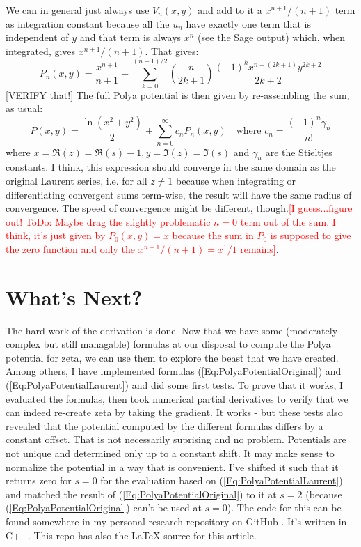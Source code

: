 \documentclass[12pt]{article}
\begin{document}
\medskip
We can in general just always use $V_n(x,y)$ and add to it a $x^{n+1}/(n+1)$ term as integration constant because all the $u_n$ have exactly one term that is independent of $y$ and that term is always $x^n$ (see the Sage output) which, when integrated, gives $x^{n+1}/(n+1)$. That gives:
\begin{equation}
\label{Eq:PolyaPotentialLaurentTerm}	
\boxed{	
P_n(x,y) = \frac{x^{n+1}}{n+1} 
           -\sum_{k=0}^{(n-1)/2} \binom{n}{2k+1} \frac{(-1)^k x^{n-(2k+1)} y^{2k+2}}{2k+2}
}
\end{equation}
[VERIFY that!] The full Polya potential is then given by re-assembling the sum, as usual:
\begin{equation}
\label{Eq:PolyaPotentialLaurent}	
\boxed{
P(x,y) = \frac{\ln(x^2 + y^2)}{2} + \sum_{n=0}^{\infty} c_n P_n(x,y)
}
\quad \text{where } c_n = \frac{(-1)^n \gamma_n}{n!}
\end{equation}
where $x = \Re(z) = \Re(s) - 1, y = \Im(z) = \Im(s)$ and $\gamma_n$ are the Stieltjes constants. I think, this expression should converge in the same domain as the original Laurent series, i.e. for all $z \neq 1$ because when integrating or differentiating convergent sums term-wise, the result will have the same radius of convergence. The speed of convergence might be different, though.\textcolor{red}{[I guess...figure out! ToDo: Maybe drag the slightly problematic $n=0$ term out of the sum. I think, it's just given by $P_0(x,y) = x$ because the sum in $P_0$ is supposed to give the zero function and only the $x^{n+1}/(n+1) = x^1/1$ remains]}.

\section{What's Next?}
The hard work of the derivation is done. Now that we have some (moderately complex but still managable) formulas at our disposal to compute the Polya potential for zeta, we can use them to explore the beast that we have created. Among others, I have implemented formulas (\ref{Eq:PolyaPotentialOriginal}) and (\ref{Eq:PolyaPotentialLaurent}) and did some first tests. To prove that it works, I evaluated the formulas, then took numerical partial derivatives to verify that we can indeed re-create zeta by taking the gradient. It works - but these tests also revealed that the potential computed by the different formulas differs by a constant offset. That is not necessarily suprising and no problem. Potentials are not unique and determined only up to a constant shift. It may make sense to normalize the potential in a way that is convenient. I've shifted it such that it returns zero for $s=0$ for the evaluation based on (\ref{Eq:PolyaPotentialLaurent}) and matched the result of (\ref{Eq:PolyaPotentialOriginal}) to it at $s=2$ (because (\ref{Eq:PolyaPotentialOriginal}) can't be used at $s=0$). The code for this can be found somewhere in my personal research repository on GitHub \cite{GitHub}. It's written in C++. This repo has also the LaTeX source for this article.
\end{document}
